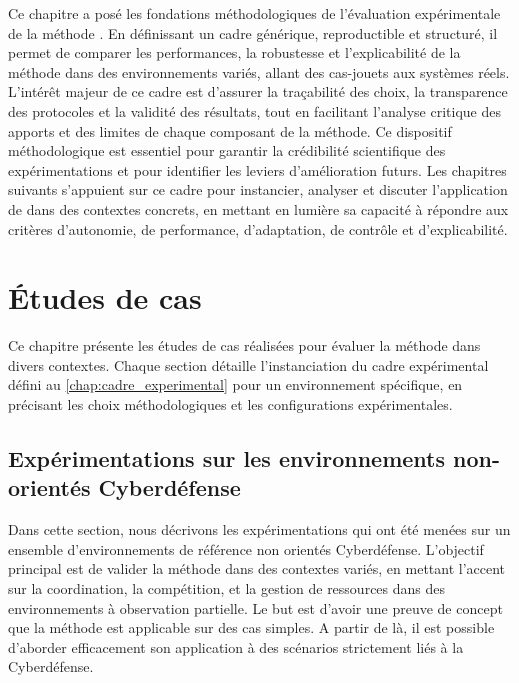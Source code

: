 Ce chapitre a posé les fondations méthodologiques de l'évaluation expérimentale de la méthode . En définissant un cadre générique, reproductible et structuré, il permet de comparer les performances, la robustesse et l'explicabilité de la méthode dans des environnements variés, allant des cas-jouets aux systèmes réels. L'intérêt majeur de ce cadre est d'assurer la traçabilité des choix, la transparence des protocoles et la validité des résultats, tout en facilitant l'analyse critique des apports et des limites de chaque composant de la méthode. Ce dispositif méthodologique est essentiel pour garantir la crédibilité scientifique des expérimentations et pour identifier les leviers d'amélioration futurs. Les chapitres suivants s'appuient sur ce cadre pour instancier, analyser et discuter l'application de  dans des contextes concrets, en mettant en lumière sa capacité à répondre aux critères d'autonomie, de performance, d'adaptation, de contrôle et d'explicabilité.


\clearpage
\thispagestyle{empty}
\null
\newpage


\chapter{Études de cas}
\label{chap:case_studies}

Ce chapitre présente les études de cas réalisées pour évaluer la méthode  dans divers contextes. Chaque section détaille l'instanciation du cadre expérimental défini au \autoref{chap:cadre_experimental} pour un environnement spécifique, en précisant les choix méthodologiques et les configurations expérimentales.

\section{Expérimentations sur les environnements non-orientés Cyberdéfense}

Dans cette section, nous décrivons les expérimentations qui ont été menées sur un ensemble d'environnements de référence non orientés Cyberdéfense. L'objectif principal est de valider la méthode  dans des contextes variés, en mettant l'accent sur la coordination, la compétition, et la gestion de ressources dans des environnements à observation partielle. Le but est d'avoir une preuve de concept que la méthode  est applicable sur des cas simples. A partir de là, il est possible d'aborder efficacement son application à des scénarios strictement liés à la Cyberdéfense.

